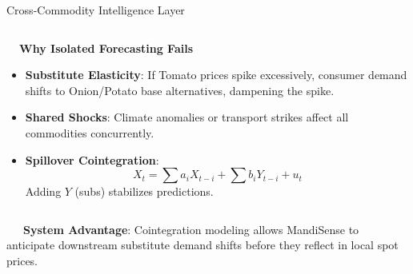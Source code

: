 \documentclass{beamer}
\begin{document}
\begin{frame}{Cross-Commodity Intelligence Layer}
\begin{columns}[T]
    \begin{column}{0.48\textwidth}
        \begin{smallcard}[0.98\textwidth, top=3pt, bottom=3pt, left=4pt, right=4pt, boxsep=0.5pt]
            \centering \textbf{\textcolor{primaryDark}{\small {}~~Why Isolated Forecasting Fails}}
            \vspace{0.08cm}
            \fontsize{6.8pt}{8.2pt}\selectfont
            \begin{itemize}\setlength\itemsep{4pt}\setlength\parskip{0pt}
                \item \textbf{Substitute Elasticity}: If Tomato prices spike excessively, consumer demand shifts to Onion/Potato base alternatives, dampening the spike.
                \item \textbf{Shared Shocks}: Climate anomalies or transport strikes affect all commodities concurrently.
                \item \textbf{Spillover Cointegration}:
                \[ X_t = \sum a_i X_{t-i} + \sum b_i Y_{t-i} + u_t \]
                Adding $Y$ (subs) stabilizes predictions.
            \end{itemize}
        \end{smallcard}
    \end{column}
\end{columns}

\vspace{0.15cm}
\begin{tcolorbox}[enhanced, colback=primaryblue!4, colframe=primaryblue!30, boxrule=0.35pt,
  arc=3.5pt, width=0.98\textwidth, left=4pt, right=4pt, top=2.5pt, bottom=2.5pt, boxsep=0pt,
  halign=center, shadow={0.5pt}{-0.5pt}{0pt}{black!8}]
    \fontsize{5.5pt}{6.5pt}\selectfont
    \textcolor{primaryDark}{~~~\textbf{System Advantage}: Cointegration modeling allows MandiSense to anticipate downstream substitute demand shifts before they reflect in local spot prices.}
\end{tcolorbox}
\end{frame}
\end{document}
